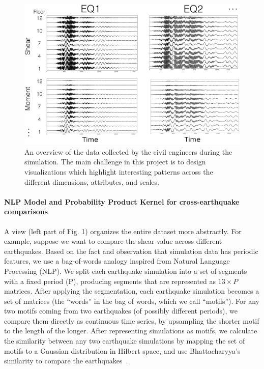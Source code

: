\begin{figure}[h]
	\centering %
	\includegraphics[width=\columnwidth]{figs/structure} 
	\caption{An overview of the data collected by the civil engineers during the simulation. The main challenge in this project is to design visualizations which highlight interesting patterns across the different dimensions, attributes, and scales.}
	\label{fig:data}
\end{figure}


\paragraph*{NLP Model and Probability Product Kernel for cross-earthquake comparisons}
\label{sec:method}
A view (left part of Fig. 1) organizes the entire dataset more abstractly. For example, suppose we want to compare the shear value across different earthquakes. Based on the fact and observation that simulation data has periodic features, we use a bag-of-words analogy inspired from Natural Language Processing (NLP). We split each earthquake simulation into a set of segments with a fixed period (P), producing segments that are represented as  $13 \times P$ matrices. After applying the segmentation, each earthquake simulation becomes a set of matrices (the ``words'' in the bag of words, which we call ``motifs''). For any two motifs coming from two earthquakes (of possibly different periods), we compare them directly as continuous time series, by upsampling the shorter motif to the length of the longer. After representing simulations as motifs, we calculate the similarity between any two earthquake simulations by mapping the set of motifs to a Gaussian distribution in Hilbert space, and use Bhattacharyya's similarity to compare the earthquakes~\cite{conf/icml/KondorJ03}.

